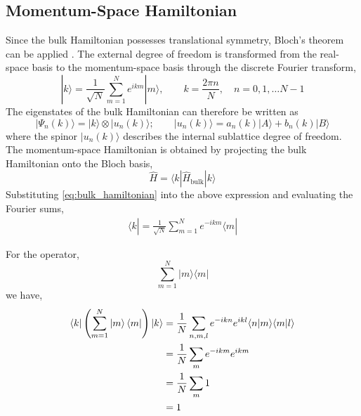 \documentclass[11pt, a4paper]{article}
\begin{document}
\subsection{Momentum-Space Hamiltonian}
Since the bulk Hamiltonian possesses translational symmetry, Bloch's theorem can be applied \cite{asboth2015,ashcroft1976}.
The external degree of freedom is transformed from the real-space basis to the momentum-space basis through the discrete Fourier transform,
\begin{equation}
    |k\rangle = \frac{1}{\sqrt{N}} \sum_{m=1}^{N} e^{ikm}|m\rangle ,\qquad k =\frac{2\pi n}{N}, \quad n = 0,1,\dots N-1
\end{equation}
The eigenstates of the bulk Hamiltonian can therefore be written as 
\begin{equation}
    |\Psi_n(k)\rangle = |k\rangle \otimes |u_n(k)\rangle; \qquad |u_n(k)\rangle= a_n(k)|A\rangle+ b_n(k) |B\rangle
\end{equation}
where the spinor $|u_n(k)\rangle$ describes the internal sublattice degree of freedom.
The momentum-space Hamiltonian is obtained by projecting the bulk Hamiltonian onto the Bloch basis,
\begin{equation*} 
    \hat{H}=\langle k|\hat{H}_{\mathrm{bulk}}|k\rangle
\end{equation*}
Substituting \cref{eq:bulk_hamiltonian} into the above expression and evaluating the Fourier sums,
\begin{align*}
    \langle k| = \frac{1}{\sqrt{N}} \sum_{m=1}^{N} e^{-ikm}\langle m|
\end{align*}

For the operator,
\begin{equation*}
    \sum_{m=1}^{N} |m\rangle \langle m|
\end{equation*}
we have, 
\begin{align*}
    \bra{k}
\left(\sum_{m=1}^{N}\ket{m}\bra{m}\right)
\ket{k}
&=
\frac1N
\sum_{n,m,l}
e^{-ikn}e^{ikl}
\langle n|m\rangle
\langle m|l\rangle
\\
&=
\frac1N
\sum_{m}
e^{-ikm}e^{ikm}
\\
&=
\frac1N
\sum_{m}1
\\
&=1
\end{align*}
\end{document}
